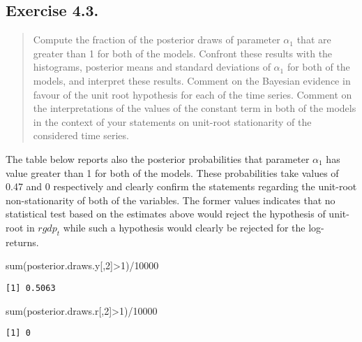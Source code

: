 \documentclass[
  letterpaper,
  DIV=11,
  numbers=noendperiod]{scrreprt}
\newenvironment{Shaded}{\begin{snugshade}}{\end{snugshade}}
\newcommand{\DecValTok}[1]{\textcolor[rgb]{0.68,0.00,0.00}{#1}}
\newcommand{\FunctionTok}[1]{\textcolor[rgb]{0.28,0.35,0.67}{#1}}
\newcommand{\NormalTok}[1]{\textcolor[rgb]{0.00,0.23,0.31}{#1}}
\newcommand{\SpecialCharTok}[1]{\textcolor[rgb]{0.37,0.37,0.37}{#1}}
\begin{document}
\hypertarget{exercise-4.3.}{%
\subsection*{Exercise 4.3.}\label{exercise-4.3.}}

\begin{quote}
Compute the fraction of the posterior draws of parameter \(\alpha_1\)
that are greater than 1 for both of the models. Confront these results
with the histograms, posterior means and standard deviations of
\(\alpha_1\) for both of the models, and interpret these results.
Comment on the Bayesian evidence in favour of the unit root hypothesis
for each of the time series. Comment on the interpretations of the
values of the constant term in both of the models in the context of your
statements on unit-root stationarity of the considered time series.
\end{quote}

The table below reports also the posterior probabilities that parameter
\(\alpha_1\) has value greater than 1 for both of the models. These
probabilities take values of 0.47 and 0 respectively and clearly confirm
the statements regarding the unit-root non-stationarity of both of the
variables. The former values indicates that no statistical test based on
the estimates above would reject the hypothesis of unit-root in
\(rgdp_t\) while such a hypothesis would clearly be rejected for the
log-returns.

\begin{Shaded}
\begin{Highlighting}[]
\FunctionTok{sum}\NormalTok{(posterior.draws.y[,}\DecValTok{2}\NormalTok{]}\SpecialCharTok{\textgreater{}}\DecValTok{1}\NormalTok{)}\SpecialCharTok{/}\DecValTok{10000}
\end{Highlighting}
\end{Shaded}

\begin{verbatim}
[1] 0.5063
\end{verbatim}

\begin{Shaded}
\begin{Highlighting}[]
\FunctionTok{sum}\NormalTok{(posterior.draws.r[,}\DecValTok{2}\NormalTok{]}\SpecialCharTok{\textgreater{}}\DecValTok{1}\NormalTok{)}\SpecialCharTok{/}\DecValTok{10000}
\end{Highlighting}
\end{Shaded}

\begin{verbatim}
[1] 0
\end{verbatim}
\end{document}
